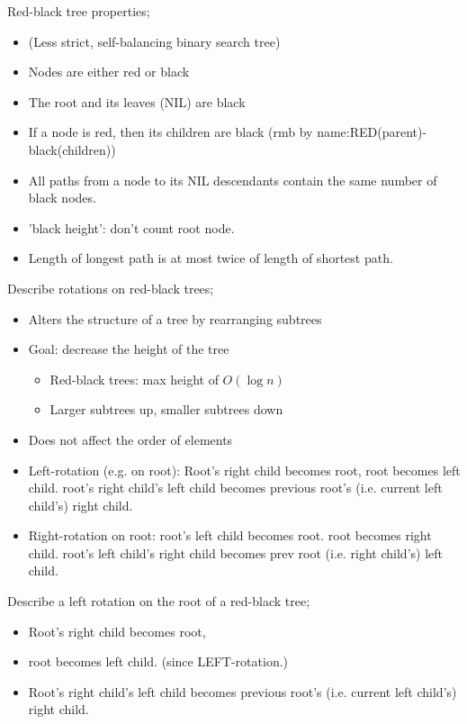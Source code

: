 \documentclass{article}
\begin{document}
Red-black tree properties; \begin{itemize} \item (Less strict, self-balancing binary search tree) \item Nodes are either red or black \item The root and its leaves (NIL) are black \item If a node is red, then its children are black (rmb by name:RED(parent)-black(children))\item All paths from a node to its NIL descendants contain the same number of black nodes.  \item 'black height': don't count root node.  \item Length of longest path is at most twice of length of shortest path. \end{itemize}

Describe rotations on red-black trees; \begin{itemize} \item Alters the structure of a tree by rearranging subtrees \item Goal: decrease the height of the tree \begin{itemize} \item Red-black trees: max height of $O(\log n)$ \item Larger subtrees up, smaller subtrees down \end{itemize} \item Does not affect the order of elements \item Left-rotation (e.g. on root): Root's right child becomes root,  root becomes left child. root's right child's left child becomes previous root's (i.e. current left child's) right child.  \item Right-rotation on root: root's left child becomes root. root becomes right child. root's left child's right child becomes prev root (i.e. right child's) left child.  \end{itemize}

Describe a left rotation on the root of a red-black tree; \begin{itemize} \item Root's right child becomes root,  \item root becomes left child. (since LEFT-rotation.) \item Root's right child's left child becomes previous root's (i.e. current left child's) right child.  \end{itemize}
\end{document}
